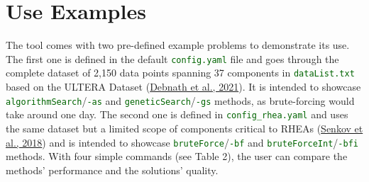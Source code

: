 \documentclass[
]{article}
\let\oldtexttt\texttt
\renewcommand{\texttt}[1]{\oldtexttt{\textcolor{darkgreen}{#1}}}
\begin{document}
\hypertarget{use-examples}{%
\section{Use Examples}\label{use-examples}}

The tool comes with two pre-defined example problems to demonstrate its
use. The first one is defined in the default \texttt{config.yaml} file
and goes through the complete dataset of 2,150 data points spanning 37
components in \texttt{dataList.txt} based on the ULTERA Dataset
(\protect\hyperlink{ref-Debnath2021}{Debnath et al., 2021}). It is
intended to showcase \texttt{algorithmSearch}/\texttt{-as} and
\texttt{geneticSearch}/\texttt{-gs} methods, as brute-forcing would take
around one day. The second one is defined in \texttt{config\_rhea.yaml}
and uses the same dataset but a limited scope of components critical to
RHEAs (\protect\hyperlink{ref-Senkov2018}{Senkov et al., 2018}) and is
intended to showcase \texttt{bruteForce}/\texttt{-bf} and
\texttt{bruteForceInt}/\texttt{-bfi} methods. With four simple commands
(see Table 2), the user can compare the methods' performance and the
solutions' quality.
\end{document}
